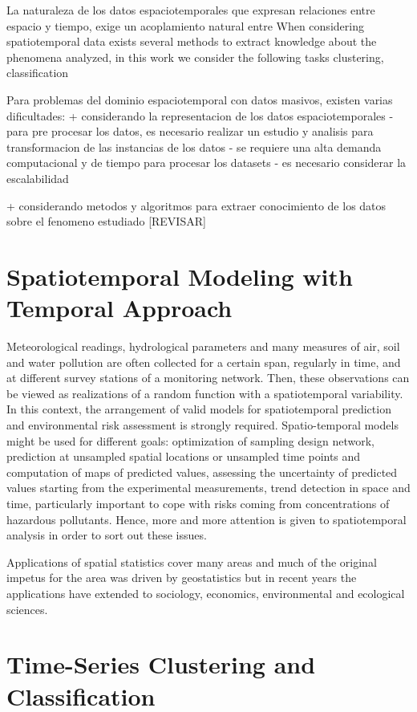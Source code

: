La naturaleza de los datos espaciotemporales que expresan relaciones entre espacio y tiempo, exige un acoplamiento natural entre 
When considering spatiotemporal data exists several methods to extract knowledge about the phenomena analyzed, in this work we consider the following tasks clustering, classification

Para problemas del dominio espaciotemporal con datos masivos, existen varias dificultades: 
+ considerando la representacion de los datos espaciotemporales
	- para pre procesar los datos, es necesario realizar un estudio y analisis para transformacion de las instancias de los datos
	- se requiere una alta demanda computacional y de tiempo para procesar los datasets
	- es necesario considerar la escalabilidad 

+ considerando metodos y algoritmos para extraer conocimiento de los datos sobre el fenomeno estudiado [REVISAR]

\section{Spatiotemporal Modeling with Temporal Approach}
\label{Sec:SPT-Temporal}

Meteorological readings, hydrological parameters and many measures of air, soil and water pollution are often collected for a certain span, regularly in time, and at different survey stations of a monitoring network. Then, these observations can be viewed as realizations of a random function with a spatiotemporal variability. In this context, the arrangement of valid models for spatiotemporal prediction and environmental risk assessment is strongly required. Spatio-temporal models might be used for different goals: optimization of sampling design network, prediction at unsampled spatial locations or unsampled time points and computation of maps of predicted values, assessing the uncertainty of predicted values starting from the experimental measurements, trend detection in space and time, particularly important to cope with risks coming from concentrations of hazardous pollutants. Hence, more and more attention is given to spatiotemporal analysis in order to sort out these issues.

Applications of spatial statistics cover many areas and much of the original impetus for the area was driven by geostatistics but in recent years the applications have extended to sociology, economics, environmental and ecological sciences.

\section{Time-Series Clustering and Classification}
\label{Sec:ClusteringRelatedWorks}

